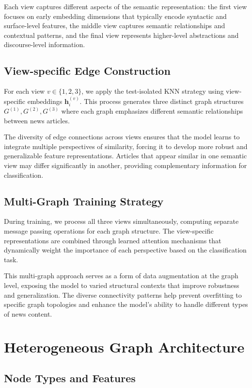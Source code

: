 Each view captures different aspects of the semantic representation: the first view focuses on early embedding dimensions that typically encode syntactic and surface-level features, the middle view captures semantic relationships and contextual patterns, and the final view represents higher-level abstractions and discourse-level information.

\subsection{View-specific Edge Construction}

For each view $v \in \{1, 2, 3\}$, we apply the test-isolated KNN strategy using view-specific embeddings $\mathbf{h}_i^{(v)}$. This process generates three distinct graph structures $G^{(1)}, G^{(2)}, G^{(3)}$ where each graph emphasizes different semantic relationships between news articles.

The diversity of edge connections across views ensures that the model learns to integrate multiple perspectives of similarity, forcing it to develop more robust and generalizable feature representations. Articles that appear similar in one semantic view may differ significantly in another, providing complementary information for classification.

\subsection{Multi-Graph Training Strategy}

During training, we process all three views simultaneously, computing separate message passing operations for each graph structure. The view-specific representations are combined through learned attention mechanisms that dynamically weight the importance of each perspective based on the classification task.

This multi-graph approach serves as a form of data augmentation at the graph level, exposing the model to varied structural contexts that improve robustness and generalization. The diverse connectivity patterns help prevent overfitting to specific graph topologies and enhance the model's ability to handle different types of news content.

\section{Heterogeneous Graph Architecture}

\subsection{Node Types and Features}

